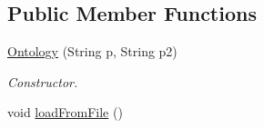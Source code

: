 \subsection*{Public Member Functions}
\begin{DoxyCompactItemize}
\item 
\hyperlink{class_ontology_1_1_ontology_a4b295f699ded2490f28a7ef27e7d10a8}{Ontology} (String p, String p2)
\begin{DoxyCompactList}\small\item\em Constructor. \end{DoxyCompactList}\item 
\hypertarget{class_ontology_1_1_ontology_acfa7d8a40bd1dc8e06abfa55b19ac993}{
void \hyperlink{class_ontology_1_1_ontology_acfa7d8a40bd1dc8e06abfa55b19ac993}{loadFromFile} ()}
\label{class_ontology_1_1_ontology_acfa7d8a40bd1dc8e06abfa55b19ac993}


\end{DoxyCompactItemize}
